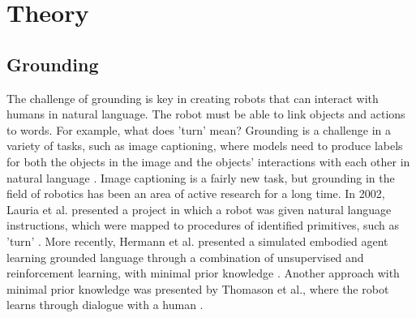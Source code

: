 \chapter{Theory}
\section{Grounding}
The challenge of grounding is key in creating robots that can interact with humans in natural language. The robot must be able to link objects and actions to words. For example, what does 'turn' mean? Grounding is a challenge in a variety of tasks, such as image captioning, where models need to produce labels for both the objects in the image and the objects' interactions with each other in natural language \cite{karpathy2014captioning}. %
Image captioning is a fairly new task, but grounding in the field of robotics has been an area of active research for a long time. In 2002, Lauria et al. presented a project in which a robot was given natural language instructions, which were mapped to procedures of identified primitives, such as 'turn' \cite{lauria2002}. More recently, Hermann et al. presented a simulated embodied agent learning grounded language through a combination of unsupervised and reinforcement learning, with minimal prior knowledge \cite{hermann2017grounded}. Another approach with minimal prior knowledge was presented by Thomason et al., where the robot learns through dialogue with a human \cite{thomason2019grounded}. \newline
